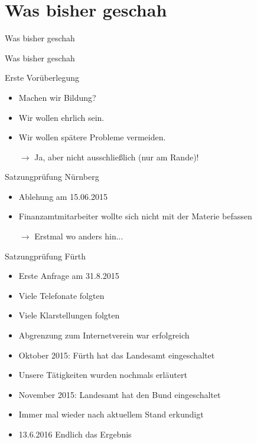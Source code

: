 \section*{Was bisher geschah}
\begin{frame}{Was bisher geschah}
    \begin{center}
        Was bisher geschah
    \end{center}
\end{frame}

\begin{frame}{Erste Vorüberlegung}
    \begin{itemize}
        \item Machen wir Bildung?
        \item Wir wollen ehrlich sein.
        \item Wir wollen spätere Probleme vermeiden.
        \item[$\rightarrow$] Ja, aber nicht ausschließlich (nur am Rande)!
    \end{itemize}
\end{frame}

\begin{frame}{Satzungprüfung Nürnberg}
    \begin{itemize}
        \item Ablehung am 15.06.2015
        \item Finanzamtmitarbeiter wollte sich nicht mit der Materie befassen
        \item[$\rightarrow$] Erstmal wo anders hin...
    \end{itemize}
\end{frame}

\begin{frame}{Satzungprüfung Fürth}
    \begin{itemize}
        \item Erste Anfrage am 31.8.2015
        \item Viele Telefonate folgten
        \item Viele Klarstellungen folgten
        \item Abgrenzung zum Internetverein war erfolgreich
        \item Oktober 2015: Fürth hat das Landesamt eingeschaltet
        \item Unsere Tätigkeiten wurden nochmals erläutert
        \item November 2015: Landesamt hat den Bund eingeschaltet
        \item Immer mal wieder nach aktuellem Stand erkundigt
        \item 13.6.2016 Endlich das Ergebnis
    \end{itemize}
\end{frame}


